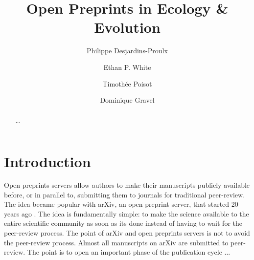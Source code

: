 \documentclass[letterpaper,twocolumn,superscriptaddress,showkeys]{revtex4}
\begin{document}
\title{Open Preprints in Ecology \& Evolution}

\author{Philippe Desjardins-Proulx}

\author{Ethan P. White}

\author{Timoth\'ee Poisot}

\author{Dominique Gravel}


\begin{abstract}

...
 
\end{abstract}

\maketitle

\section{Introduction}

Open preprints servers allow authors to make their manuscripts publicly
available before, or in parallel to, submitting them to journals for traditional
peer-review. The idea became popular with arXiv, an open preprint server, that
started 20 years ago \cite{gin11}. The idea is fundamentally simple: to make the
science available to the entire scientific community as soon as its done instead
of having to wait for the peer-review process. The point of arXiv and open
preprints servers is not to avoid the peer-review process. Almost all
manuscripts on arXiv are submitted to peer-review. The point is to open an
important phase of the publication cycle ...
\end{document}
